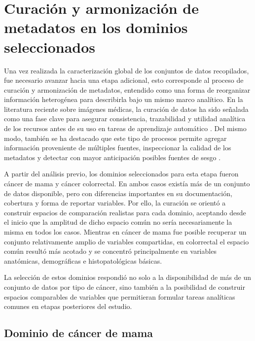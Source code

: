 \section{Curación y armonización de metadatos en los dominios seleccionados}
\label{sec:caracterizacion_datasets}

Una vez realizada la caracterización global de los conjuntos de datos recopilados, fue necesario avanzar hacia una etapa adicional, esto corresponde al proceso de curación y armonización de metadatos, entendido como una forma de reorganizar información heterogénea para describirla bajo un mismo marco analítico. En la literatura reciente sobre imágenes médicas, la curación de datos ha sido señalada como una fase clave para asegurar consistencia, trazabilidad y utilidad analítica de los recursos antes de su uso en tareas de aprendizaje automático \parencite{Galbusera2024ImageCurationRadiology}. Del mismo modo, también se ha destacado que este tipo de procesos permite agregar información proveniente de múltiples fuentes, inspeccionar la calidad de los metadatos y detectar con mayor anticipación posibles fuentes de sesgo \parencite{Denner2023MedicalImageDatasetPreparation}.

A partir del análisis previo, los dominios seleccionados para esta etapa fueron cáncer de mama y cáncer colorrectal. En ambos casos existía más de un conjunto de datos disponible, pero con diferencias importantes en su documentación, cobertura y forma de reportar variables. Por ello, la curación se orientó a construir espacios de comparación realistas para cada dominio, aceptando desde el inicio que la amplitud de dicho espacio común no sería necesariamente la misma en todos los casos. Mientras en cáncer de mama fue posible recuperar un conjunto relativamente amplio de variables compartidas, en colorrectal el espacio común resultó más acotado y se concentró principalmente en variables anatómicas, demográficas e histopatológicas básicas.

La selección de estos dominios respondió no solo a la disponibilidad de más de un conjunto de datos por tipo de cáncer, sino también a la posibilidad de construir espacios comparables de variables que permitieran formular tareas analíticas comunes en etapas posteriores del estudio.

\subsection{Dominio de cáncer de mama}

